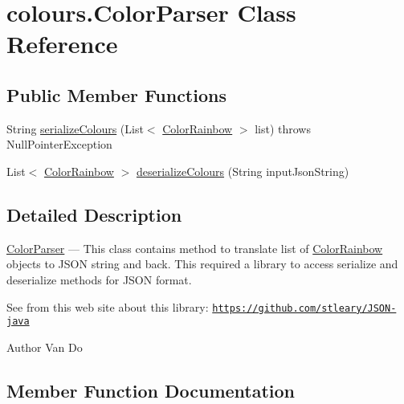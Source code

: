 \hypertarget{classcolours_1_1_color_parser}{}\section{colours.\+Color\+Parser Class Reference}
\label{classcolours_1_1_color_parser}
\subsection*{Public Member Functions}
\begin{DoxyCompactItemize}
\item 
String \hyperlink{classcolours_1_1_color_parser_a3a8b5f6c8bd9045b63fd8e162f3c96d3}{serialize\+Colours} (List$<$ \hyperlink{classcolours_1_1_color_rainbow}{Color\+Rainbow} $>$ list)  throws Null\+Pointer\+Exception     
\item 
List$<$ \hyperlink{classcolours_1_1_color_rainbow}{Color\+Rainbow} $>$ \hyperlink{classcolours_1_1_color_parser_a1b1dd2f7269dd1fe21a88befb27c4f3f}{deserialize\+Colours} (String input\+Json\+String)
\end{DoxyCompactItemize}


\subsection{Detailed Description}
\hyperlink{classcolours_1_1_color_parser}{Color\+Parser} --- This class contains method to translate list of \hyperlink{classcolours_1_1_color_rainbow}{Color\+Rainbow} objects to J\+S\+ON string and back. This required a library to access serialize and deserialize methods for J\+S\+ON format. 

See from this web site about this library\+: \href{https://github.com/stleary/JSON-java}{\tt https\+://github.\+com/stleary/\+J\+S\+O\+N-\/java}

\begin{DoxyAuthor}{Author}
Van Do 
\end{DoxyAuthor}


\subsection{Member Function Documentation}
\mbox{\label{classcolours_1_1_color_parser_a1b1dd2f7269dd1fe21a88befb27c4f3f}} 
